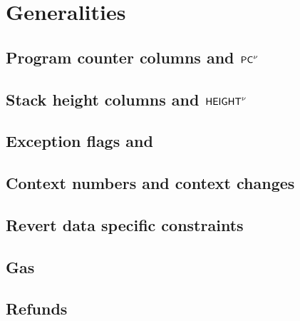 
\section{Generalities}                                                                           \label{hub: generalities}
\subsection{Program counter columns \pc{} and $\textsf{PC}^{\nu}$                            \lispDone{}}  \label{hub: generalities: program counter}                                 
\subsection{Stack height columns \height{} and $\textsf{HEIGHT}^{\nu}$                       \lispTodo{}}  \label{hub: generalities: stack height}                                    
\subsection{Exception flags and \XAHOY{}                                           \lispDone{}}  \label{hub: generalities: exceptions}                                      
\subsection{Context numbers and context changes                                    \lispDone{}}  \label{hub: generalities: context changes}                                 
\subsection{Revert data specific constraints                                       \lispDone{}}  \label{hub: generalities: revert}                                          
\subsection{Gas                                                                    \lispDone{}}  \label{hub: generalities: gas}                                             
\subsection{Refunds                                                                \lispDone{}}  \label{hub: generalities: refunds}                                         

